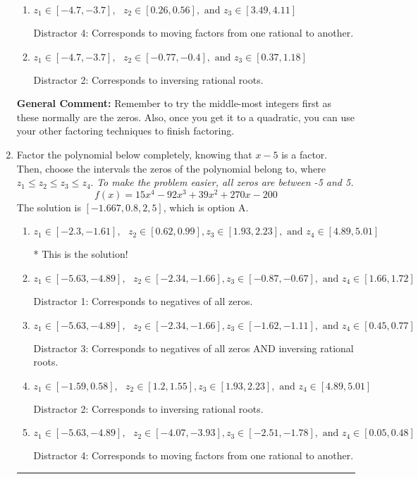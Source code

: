 \documentclass{extbook}[14pt]
\newcommand{\litem}[1]{\item #1

\rule{\textwidth}{0.4pt}}
\begin{document}
\begin{enumerate}
{\begin{enumerate}[label=\Alph*.]
* This is the solution!
\item \( z_1 \in [-4.7, -3.7], \text{   }  z_2 \in [0.26, 0.56], \text{   and   } z_3 \in [3.49, 4.11] \)

 Distractor 4: Corresponds to moving factors from one rational to another.
\item \( z_1 \in [-4.7, -3.7], \text{   }  z_2 \in [-0.77, -0.4], \text{   and   } z_3 \in [0.37, 1.18] \)

 Distractor 2: Corresponds to inversing rational roots.
\end{enumerate}

\textbf{General Comment:} Remember to try the middle-most integers first as these normally are the zeros. Also, once you get it to a quadratic, you can use your other factoring techniques to finish factoring.
}
\litem{
Factor the polynomial below completely, knowing that $x -5$ is a factor. Then, choose the intervals the zeros of the polynomial belong to, where $z_1 \leq z_2 \leq z_3 \leq z_4$. \textit{To make the problem easier, all zeros are between -5 and 5.}
\[ f(x) = 15x^{4} -92 x^{3} +39 x^{2} +270 x -200 \]The solution is \( [-1.667, 0.8, 2, 5] \), which is option A.\begin{enumerate}[label=\Alph*.]
\item \( z_1 \in [-2.3, -1.61], \text{   }  z_2 \in [0.62, 0.99], z_3 \in [1.93, 2.23], \text{   and   } z_4 \in [4.89, 5.01] \)

* This is the solution!
\item \( z_1 \in [-5.63, -4.89], \text{   }  z_2 \in [-2.34, -1.66], z_3 \in [-0.87, -0.67], \text{   and   } z_4 \in [1.66, 1.72] \)

 Distractor 1: Corresponds to negatives of all zeros.
\item \( z_1 \in [-5.63, -4.89], \text{   }  z_2 \in [-2.34, -1.66], z_3 \in [-1.62, -1.11], \text{   and   } z_4 \in [0.45, 0.77] \)

 Distractor 3: Corresponds to negatives of all zeros AND inversing rational roots.
\item \( z_1 \in [-1.59, 0.58], \text{   }  z_2 \in [1.2, 1.55], z_3 \in [1.93, 2.23], \text{   and   } z_4 \in [4.89, 5.01] \)

 Distractor 2: Corresponds to inversing rational roots.
\item \( z_1 \in [-5.63, -4.89], \text{   }  z_2 \in [-4.07, -3.93], z_3 \in [-2.51, -1.78], \text{   and   } z_4 \in [0.05, 0.48] \)

 Distractor 4: Corresponds to moving factors from one rational to another.
\end{enumerate}

}
\end{enumerate}
\end{document}
